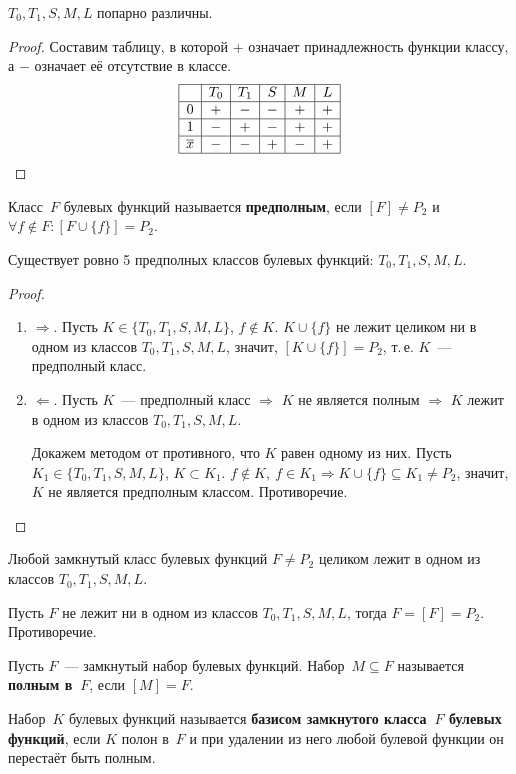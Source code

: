 \begin{statement}
$T_0, T_1, S, M, L$ попарно различны.
\end{statement}
\begin{proof}
Составим таблицу, в которой $+$ означает принадлежность функции классу, а $-$ означает её отсутствие в классе.
\begin{equation*}
\begin{array}{|c|c|c|c|c|c|}
\hline
  & T_0 & T_1 & S & M & L \\
  \hline
0 & + & - & - & + & + \\
\hline
1 & - & + & - & + & + \\
\hline
\overline x & - & - & + & - & + \\
\hline
\end{array}
\end{equation*}
\end{proof}

Класс~$F$ булевых функций называется \textbf{предполным}, если $[F] \neq P_2$ и $\forall f \notin F \colon [F \cup \{ f \}] = P_2$.

\begin{statement}
Существует ровно 5 предполных классов булевых функций: $T_0, T_1, S, M, L$.
\end{statement}
\begin{proof}
\begin{enumerate}
	\item $\Rightarrow$. Пусть $K \in \{ T_0, T_1, S, M, L \}$, $f \notin K$.
	$K \cup \{ f \}$ не лежит целиком ни в одном из классов $T_0, T_1, S, M, L$, значит, $[K \cup \{ f \}] = P_2$, т.\,е. $K$~--- предполный класс.
	\item $\Leftarrow$. Пусть $K$~--- предполный класс $\Rightarrow$ $K$ не является полным $\Rightarrow$ $K$ лежит в одном из классов $T_0, T_1, S, M, L$.
	
	Докажем методом от противного, что $K$ равен одному из них.
	Пусть $K_1 \in \{ T_0, T_1, S, M, L \}$, $K \subset K_1$.
	$f \notin K, \ f \in K_1 \Rightarrow K \cup \{ f \} \subseteq K_1 \neq P_2$, значит, $K$ не является предполным классом.
	Противоречие.
\end{enumerate}
\end{proof}

\begin{consequent}
Любой замкнутый класс булевых функций $F \neq P_2$ целиком лежит в одном из классов $T_0, T_1, S, M, L$.
\end{consequent}
\begin{proofcontra}
Пусть $F$ не лежит ни в одном из классов $T_0, T_1, S, M, L$, тогда $F = [F] = P_2$.
Противоречие.
\end{proofcontra}

Пусть $F$~--- замкнутый набор булевых функций. Набор~$M \subseteq F$ называется \textbf{полным в~$F$}, если $[M] = F$.

 Набор~$K$ булевых функций называется \textbf{базисом замкнутого класса~$F$ булевых функций}, если $K$ полон в~$F$ и при удалении из него любой булевой функции он перестаёт быть полным.